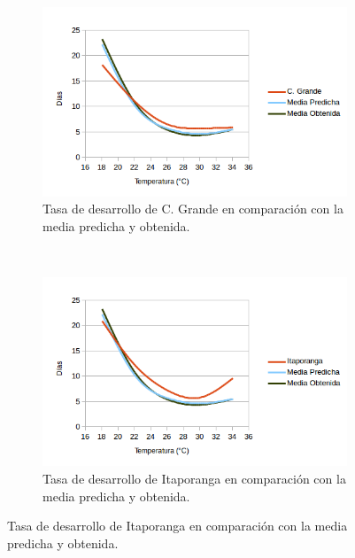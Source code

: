 \begin{figure}[!htbp]
\begin{subfigure}[b]{0.45\textwidth}
    \end{subfigure}
    \begin{subfigure}[b]{0.45\textwidth}
            \includegraphics[width=\textwidth]{capitulo-6/graphics/desarrollo-larva-3.png}
            \caption{Tasa de desarrollo de C. Grande en comparación con la media predicha y obtenida.}
    \end{subfigure}
    ~~~~
    \begin{subfigure}[b]{0.45\textwidth}
            \includegraphics[width=\textwidth]{capitulo-6/graphics/desarrollo-larva-4.png}
            \caption{Tasa de desarrollo de Itaporanga en comparación con la media predicha y obtenida.}


\end{subfigure}
\end{figure}
